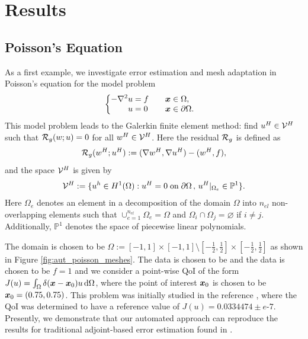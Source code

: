\section{Results}

\subsection{Poisson's Equation}

As a first example, we investigate error estimation and mesh adaptation
in Poisson's equation for the model problem
%
\begin{gather}
\begin{cases}
\begin{aligned}
- \nabla^2 u &= f \quad && \boldsymbol{x} \in \Omega, \\
u &= 0 \quad && \boldsymbol{x} \in \partial \Omega.
\end{aligned}
\end{cases}
\end{gather}
%
This model problem leads to the Galerkin finite element method: find
$u^H \in \mathcal{V}^H$ such that $\mathcal{R}_g(w; u) = 0$ for all $w^H \in \mathcal{V}^H$.
Here the residual $\mathcal{R}_g$ is defined as
%
\begin{gather}
\mathcal{R}_g(w^H; u^H) := (\nabla w^H, \nabla u^H) - (w^H, f),
\end{gather}
%
and the space $\mathcal{V}^H$ is given by
%
\begin{gather}
\mathcal{V}^H := \{ u^h \in H^1(\Omega) :
u^H = 0 \; \text{on} \; \partial \Omega \, , \,
u^H |_{\Omega_e} \in \mathbb{P}^1 \}.
\label{eq:aut_poisson_space}
\end{gather}
%
Here $\Omega_e$ denotes an element in a decomposition of the
domain $\Omega$ into $n_{el}$ non-overlapping elements such that
$\cup_{e=1}^{n_{el}} \Omega_e = \Omega$ and
$\Omega_i \cap \Omega_j = \varnothing$ if $i \neq j$.
Additionally,  $\mathbb{P}^1$ denotes the space of piecewise linear
polynomials.

The domain is chosen to be
$\Omega := [-1,1] \times [-1,1] \setminus
[-\frac12, \frac12] \times [-\frac12, \frac12]$ as shown in
Figure \ref{fig:aut_poisson_meshes}. The data is chosen to be
and the data is chosen to be $f=1$ and we consider a point-wise
QoI of the form
$J(u) = \int_{\Omega} \delta(\boldsymbol{x} - \boldsymbol{x}_0) u \, \text{d} \Omega$,
where the point of interest $\boldsymbol{x}_0$ is chosen to be
$\boldsymbol{x}_0 = (0.75, 0.75)$. This problem was initially studied in
the reference \cite{dealiistep14}, where the QoI was determined
to have a reference value of $J(u) = 0.0334474 \pm e\mbox{-}7$.
Presently, we demonstrate that our automated approach can
reproduce the results for traditional adjoint-based error estimation
found in \cite{dealiistep14}.


